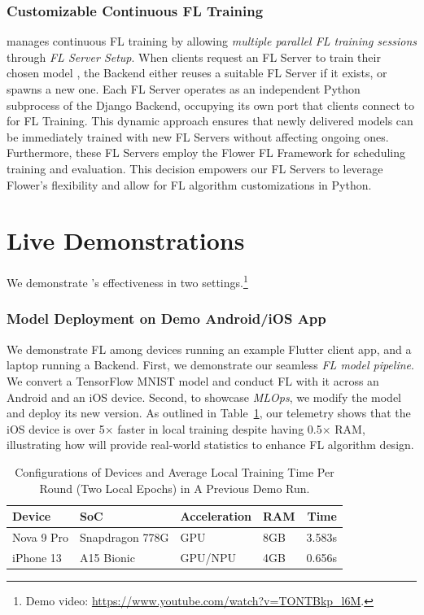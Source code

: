 \documentclass[conference]{IEEEtran}
\begin{document}
\subsubsection{Customizable Continuous FL Training}
\FedKit{} manages continuous FL training by allowing \textit{multiple parallel FL training sessions}
through \textit{FL Server Setup}.
When clients request an FL Server to
train their chosen model \model{},
the Backend either reuses a suitable FL Server \fs{} if it exists,
or spawns a new one.
Each FL Server
operates as an independent Python subprocess of the Django Backend,
occupying its own port that
clients connect to for FL Training.
This dynamic approach ensures that
newly delivered models can be immediately trained with new FL Servers
without affecting ongoing ones.
Furthermore,
these FL Servers employ the Flower FL Framework for
scheduling training and evaluation.
This decision empowers our FL Servers to leverage Flower's flexibility and
allow for FL algorithm customizations in Python.

\section{Live Demonstrations}

We demonstrate \FedKit{}'s effectiveness in two settings.\footnote{
    Demo video: \url{https://www.youtube.com/watch?v=TONTBkp_l6M}.
}

\subsubsection{Model Deployment on Demo Android/iOS App}
We demonstrate FL among
devices running an example Flutter client app,
and a laptop running a \FedKit{} Backend.
First, we demonstrate our seamless \textit{FL model pipeline}.
We convert a TensorFlow MNIST model and
conduct FL with it across an Android and an iOS device.
Second, to showcase \textit{MLOps},
we modify the model and deploy its new version.
As outlined in Table~\ref{tbl:demo-stats},
our telemetry shows that
the iOS device is over 5$\times$ faster in local training despite
having 0.5$\times$ RAM,
illustrating how \FedKit{} will provide real-world statistics to
enhance FL algorithm design.

\begin{table}
    \centering
    \setlength{\tabcolsep}{5pt}
\begin{tabular}{llllr}
Device      & SoC               & Acceleration  & RAM   & Time   \\\hline
Nova 9 Pro  & Snapdragon 778G   & GPU           & 8GB   & 3.583s \\
iPhone 13   & A15 Bionic        & GPU/NPU       & 4GB   & 0.656s \\
\end{tabular}
\caption{Configurations of Devices and Average Local Training Time Per Round
    (Two Local Epochs) in A Previous Demo Run.
}
\label{tbl:demo-stats}
\end{table}
\end{document}
